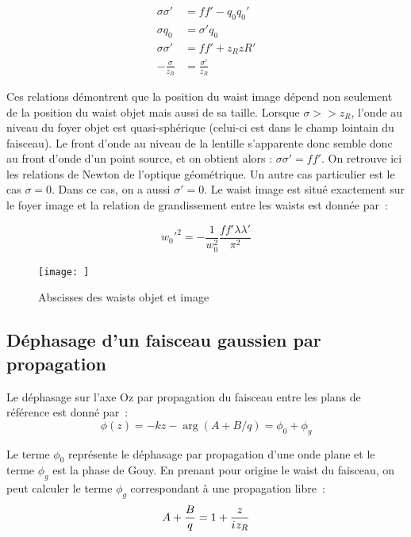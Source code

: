 \documentclass[a4paper]{book}
\newcommand{\iu}{{i\mkern1mu}}
\begin{document}
\begin{align}
    \sigma \sigma'&=ff'-q_0q_0'\\
    \sigma q_0 &= \sigma'q_0\\
    \sigma \sigma' &= ff' + z_RzR'\\
    -\frac{\sigma}{z_R}&=\frac{\sigma'}{z_R}
\end{align}

Ces relations démontrent que la position du waist image dépend non seulement de la position du waist objet mais aussi de sa taille. Lorsque $\sigma>>z_R$, l'onde au niveau du foyer objet est quasi-sphérique (celui-ci est dans le champ lointain du faisceau). Le front d'onde au niveau de la lentille s'apparente donc semble donc au front d'onde d'un point source, et on obtient alors : $\sigma\sigma'=ff'$. On retrouve ici les relations de Newton de l'optique géométrique.
Un autre cas particulier est le cas $\sigma=0$. Dans ce cas, on a aussi $\sigma'=0$. Le waist image est situé exactement sur le foyer image et la relation de grandissement entre les waists est donnée par~:

\begin{equation}
    w_0'^2=-\frac{1}{w_0^2}\frac{ff'\lambda\lambda'}{\pi^2}
\end{equation}

\begin{figure}[!htbp]
\begin{center}
\texttt{[image: ]}
\end{center}
\caption{Abscisses des waists objet et image}
\label{fig:conjugaison_gauss}
\end{figure}


\subsection{Déphasage d'un faisceau gaussien par propagation}

Le déphasage sur l'axe Oz par propagation du faisceau entre les plans de référence est donné par~:
\begin{equation}
    \phi(z) = -kz-\arg(A+B/q) = \phi_0+\phi_g
\end{equation}

Le terme $\phi_0$ représente le déphasage par propagation d'une onde plane et le terme $\phi_g$ est la phase de Gouy. En prenant pour origine le waist du faisceau, on peut calculer le terme $\phi_g$ correspondant à une propagation libre~:
\begin{equation}
    A+\frac{B}{q}=1+\frac{z}{\iu z_R}
\end{equation}
\end{document}
